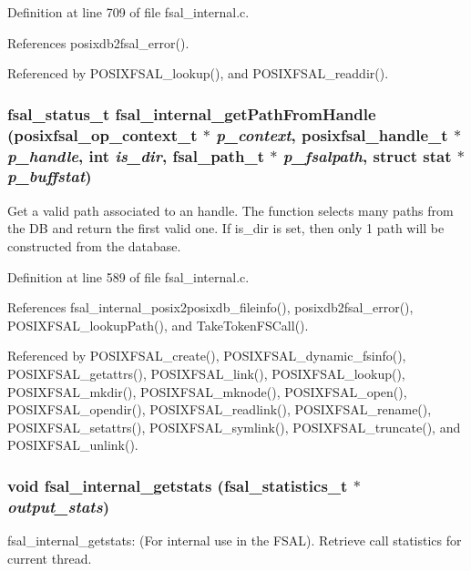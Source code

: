 Definition at line 709 of file fsal\_\-internal.c.

References posixdb2fsal\_\-error().

Referenced by POSIXFSAL\_\-lookup(), and POSIXFSAL\_\-readdir().
\subsubsection[{fsal\_\-internal\_\-getPathFromHandle}]{\setlength{\rightskip}{0pt plus 5cm}fsal\_\-status\_\-t fsal\_\-internal\_\-getPathFromHandle (posixfsal\_\-op\_\-context\_\-t $\ast$ {\em p\_\-context}, \/  posixfsal\_\-handle\_\-t $\ast$ {\em p\_\-handle}, \/  int {\em is\_\-dir}, \/  fsal\_\-path\_\-t $\ast$ {\em p\_\-fsalpath}, \/  struct stat $\ast$ {\em p\_\-buffstat})}\label{fsal__internal_8c_ad30ca12090107e92be58afcfbb153845}
Get a valid path associated to an handle. The function selects many paths from the DB and return the first valid one. If is\_\-dir is set, then only 1 path will be constructed from the database. 

Definition at line 589 of file fsal\_\-internal.c.

References fsal\_\-internal\_\-posix2posixdb\_\-fileinfo(), posixdb2fsal\_\-error(), POSIXFSAL\_\-lookupPath(), and TakeTokenFSCall().

Referenced by POSIXFSAL\_\-create(), POSIXFSAL\_\-dynamic\_\-fsinfo(), POSIXFSAL\_\-getattrs(), POSIXFSAL\_\-link(), POSIXFSAL\_\-lookup(), POSIXFSAL\_\-mkdir(), POSIXFSAL\_\-mknode(), POSIXFSAL\_\-open(), POSIXFSAL\_\-opendir(), POSIXFSAL\_\-readlink(), POSIXFSAL\_\-rename(), POSIXFSAL\_\-setattrs(), POSIXFSAL\_\-symlink(), POSIXFSAL\_\-truncate(), and POSIXFSAL\_\-unlink().
\subsubsection[{fsal\_\-internal\_\-getstats}]{\setlength{\rightskip}{0pt plus 5cm}void fsal\_\-internal\_\-getstats (fsal\_\-statistics\_\-t $\ast$ {\em output\_\-stats})}\label{fsal__internal_8c_a6de88949985cac9da4cd3fb302fb80a7}
fsal\_\-internal\_\-getstats: (For internal use in the FSAL). Retrieve call statistics for current thread.


